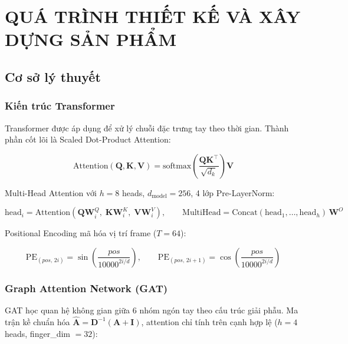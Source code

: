 \chapter{QUÁ TRÌNH THIẾT KẾ VÀ XÂY DỰNG SẢN PHẨM}
\section{Cơ sở lý thuyết}

\subsection{Kiến trúc Transformer}

Transformer được áp dụng để xử lý chuỗi đặc trưng tay theo thời gian. Thành phần cốt lõi là Scaled Dot-Product Attention:

\begin{equation}
    \text{Attention}(\mathbf{Q}, \mathbf{K}, \mathbf{V}) 
    = \text{softmax}\!\left(\frac{\mathbf{Q}\mathbf{K}^\top}{\sqrt{d_k}}\right)\mathbf{V}
\end{equation}

Multi-Head Attention với $h = 8$ heads, $d_\text{model} = 256$, 4 lớp Pre-LayerNorm:

\begin{equation}
    \text{head}_i = \text{Attention}(\mathbf{Q}\mathbf{W}_i^Q,\; \mathbf{K}\mathbf{W}_i^K,\; \mathbf{V}\mathbf{W}_i^V), \qquad
    \text{MultiHead} = \text{Concat}(\text{head}_1, \ldots, \text{head}_h)\,\mathbf{W}^O
\end{equation}

Positional Encoding mã hóa vị trí frame ($T = 64$):

\begin{equation}
    \text{PE}_{(pos,\,2i)} = \sin\!\left(\frac{pos}{10000^{2i/d}}\right), \qquad
    \text{PE}_{(pos,\,2i+1)} = \cos\!\left(\frac{pos}{10000^{2i/d}}\right)
\end{equation}

\subsection{Graph Attention Network (GAT)}

GAT học quan hệ không gian giữa 6 nhóm ngón tay theo cấu trúc giải phẫu. Ma trận kề chuẩn hóa $\hat{\mathbf{A}} = \mathbf{D}^{-1}(\mathbf{A} + \mathbf{I})$, attention chỉ tính trên cạnh hợp lệ ($h = 4$ heads, finger\_dim $= 32$):

